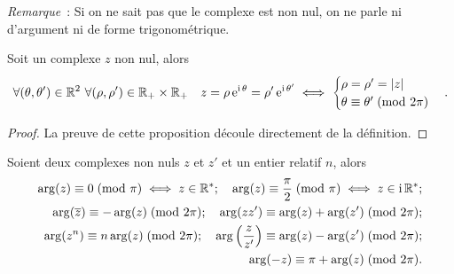                       \emph{Remarque}~: Si on ne sait pas que le complexe est non nul, on ne parle ni 
                      d'argument ni de forme trigonométrique.

                      \begin{prop}
                        Soit un complexe \(z\) non nul, alors
                        \begin{equation}
                          \forall (\theta, \theta') \in \mathbb{R}^2 \ \forall (\rho, \rho') \in \mathbb{R}_{+} 
                          \times \mathbb{R}_{+} \quad z = \rho \operatorname{e}^{\operatorname{i} \theta} = \rho' \operatorname{e}^{\operatorname{i} \theta'} 
                          \iff
                          \begin{cases}
                            \rho = \rho' = \left\lvert z\right\rvert \\
                            \theta \equiv \theta'\!\pmod {2\pi}
                          \end{cases}.
                        \end{equation}
                      \end{prop}

                      \begin{proof}
                        La preuve de cette proposition découle directement de la définition.
                      \end{proof}

                      \begin{prop}
                        Soient deux complexes non nuls \(z\) et \(z'\) et un entier relatif \(n\), 
                        alors
                        \begin{align*}
                          \arg(z) \equiv 0\!\pmod {\pi} \iff z \in \mathbb{R}^*; \quad 
                          \arg(z) \equiv \frac{\pi}{2}\!\pmod {\pi} \iff z \in \operatorname{i}\mathbb{R}^{*};\\
                          \arg(\overline{z}) \equiv -\arg(z)\!\pmod {2\pi}; \quad \arg(z 
                          z') \equiv \arg(z) + \arg(z')\!\pmod {2\pi}; \\
                          \arg(z^n) \equiv n \arg(z)\!\pmod {2\pi}; \quad \arg 
                          \left(\frac{z}{z'} \right) \equiv \arg(z) - \arg(z') \!\pmod {2\pi}; \\
                          \arg(-z) \equiv \pi + \arg(z)\!\pmod {2\pi}.
                        \end{align*}
                      \end{prop}

